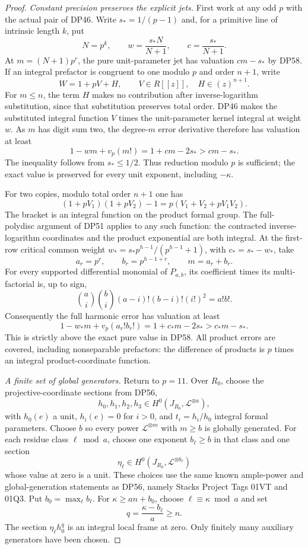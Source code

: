 \documentclass[11pt,a4paper]{article}
\theoremstyle{definition}\newtheorem{remark}[theorem]{Remark}
\begin{document}
\begin{proof}
\emph{Constant precision preserves the explicit jets.}
First work at any odd $p$ with the actual pair of DP46.
Write $s_*=1/(p-1)$ and, for a primitive line of intrinsic length $k$, put
\[
 N=p^k,\qquad w=\frac{s_*N}{N+1},\qquad
 c=\frac{s_*}{N+1}.
\]
At $m=(N+1)p^r$, the pure unit-parameter jet has valuation $cm-s_*$ by DP58.
If an integral prefactor is congruent to one modulo $p$ and order $n+1$, write
\[
 W=1+pV+H,\qquad V\in R[[z]],\quad H\in(z)^{n+1}.
\]
For $m\le n$, the term $H$ makes no contribution after inverse-logarithm substitution, since that substitution preserves total order.
DP46 makes the substituted integral function $V$ times the unit-parameter kernel integral at weight $w$.
As $m$ has digit sum two, the degree-$m$ error derivative therefore has valuation at least
\[
 1-wm+v_p(m!)=1+cm-2s_*>cm-s_*.
\]
The inequality follows from $s_*\le1/2$.
Thus reduction modulo $p$ is sufficient; the exact value is preserved for every unit exponent, including $-\kappa$.

For two copies, modulo total order $n+1$ one has
\[
 (1+pV_1)(1+pV_2)-1
 =p(V_1+V_2+pV_1V_2).
\]
The bracket is an integral function on the product formal group.
The full-polydisc argument of DP51 applies to any such function: the contracted inverse-logarithm coordinates and the product exponential are both integral.
At the first-row critical common weight
$w_*=s_*p^{h-1}/(p^{h-1}+1)$, with $c_*=s_*-w_*$, take
\[
 a_r=p^r,\qquad b_r=p^{h-1+r},\qquad m=a_r+b_r.
\]
For every supported differential monomial of $P_{a,b}$, its coefficient times its multi-factorial is, up to sign,
\[
 \binom ai\binom bi(a-i)!(b-i)!(i!)^2=a!b!.
\]
Consequently the full harmonic error has valuation at least
\[
 1-w_*m+v_p(a_r!b_r!)
 =1+c_*m-2s_*>c_*m-s_*.
\]
This is strictly above the exact pure value in DP58.
All product errors are covered, including nonseparable prefactors: the difference of products is $p$ times an integral product-coordinate function.

\emph{A finite set of global generators.}
Return to $p=11$.
Over $R_0$, choose the projective-coordinate sections from DP56,
\[
 h_0,h_1,h_2,h_3\in H^0(J_{R_0},\mathcal L^{\otimes a}),
\]
with $h_0(e)$ a unit, $h_i(e)=0$ for $i>0$, and $t_i=h_i/h_0$ integral formal parameters.
Choose $b$ so every power $\mathcal L^{\otimes m}$ with $m\ge b$ is globally generated.
For each residue class $\ell\bmod a$, choose one exponent $b_\ell\ge b$ in that class and one section
\[
 \eta_\ell\in H^0(J_{R_0},\mathcal L^{\otimes b_\ell})
\]
whose value at zero is a unit.
These choices use the same known ample-power and global-generation statements as DP56, namely Stacks Project Tags 01VT and 01Q3.
Put $b_0=\max_\ell b_\ell$.
For $\kappa\ge an+b_0$, choose $\ell\equiv\kappa\bmod a$ and set
\[
 q=\frac{\kappa-b_\ell}{a}\ge n.
\]
The section $\eta_\ell h_0^q$ is an integral local frame at zero.
Only finitely many auxiliary generators have been chosen.


\end{proof}
\end{document}
